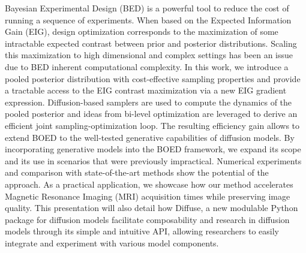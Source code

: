 \begin{talk}
    Bayesian  Experimental Design (BED) is a powerful tool to reduce the cost of running a sequence of experiments.
    When based on the Expected Information Gain (EIG), design optimization corresponds to the maximization of some intractable expected  contrast between prior and posterior distributions.
    Scaling this maximization to high dimensional and complex settings has been an issue due to BED inherent computational complexity.
    In this work, we introduce a pooled posterior distribution with cost-effective sampling properties and provide a tractable access to the EIG contrast maximization via a new EIG gradient expression. Diffusion-based samplers are used to compute the dynamics of the pooled posterior and ideas from bi-level optimization are leveraged to derive an efficient joint sampling-optimization loop.
    The resulting efficiency gain allows to extend BOED to the well-tested generative capabilities of diffusion models.
    By incorporating generative models into the BOED framework, we expand its scope and its use in scenarios that were previously impractical. Numerical experiments and comparison with state-of-the-art methods show the potential of the approach.
    As a practical application, we showcase how our method accelerates Magnetic Resonance Imaging (MRI) acquisition times while preserving image quality.
    This presentation will also detail how Diffuse, a new modulable Python package for diffusion models facilitate composability and research in diffusion models through its simple and intuitive API, allowing researchers to easily integrate and experiment with various model components.

\end{talk}

